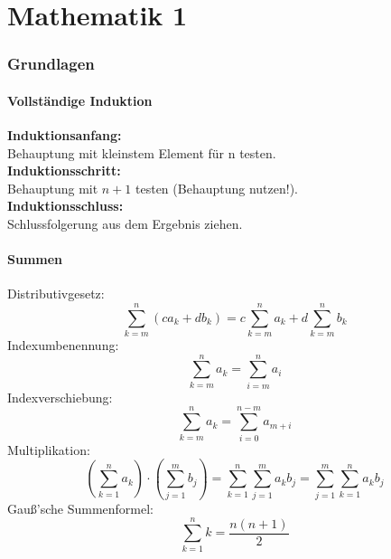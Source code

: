 \documentclass[a4paper,twocolumn,10pt]{article}
\begin{document}
\tableofcontents
\newpage

\part{Mathematik 1}

\section{Grundlagen}

\subsection{Vollständige Induktion}
\textbf{Induktionsanfang:}\\
Behauptung mit kleinstem Element für n testen.\\
\textbf{Induktionsschritt:}\\
Behauptung mit $n+1$ testen (Behauptung nutzen!).\\
\textbf{Induktionsschluss:}\\
Schlussfolgerung aus dem Ergebnis ziehen.

\subsection{Summen}
Distributivgesetz:\\
\begin{equation*}
\sum\limits_{k=m}^{n}(ca_k+db_k)=c\sum\limits_{k=m}^{n}a_k+d\sum\limits_{k=m}^{n}b_k
\end{equation*}
Indexumbenennung:\\
\begin{equation*}
\sum\limits_{k=m}^{n}a_k=\sum\limits_{i=m}^{n}a_i
\end{equation*}
Indexverschiebung:\\
\begin{equation*}
\sum\limits_{k=m}^{n}a_k=\sum\limits_{i=0}^{n-m}a_{m+i}
\end{equation*}
Multiplikation:\\
\begin{equation*}
\left(\sum\limits_{k=1}^{n}a_k\right)\cdot \left(\sum\limits_{j=1}^{m}b_j\right)=\sum\limits_{k=1}^{n}\sum\limits_{j=1}^{m}a_kb_j=\sum\limits_{j=1}^{m}\sum\limits_{k=1}^{n}a_kb_j
\end{equation*}
Gauß'sche Summenformel:\\
\begin{equation*}
\sum\limits_{k=1}^{n}k=\frac{n(n+1)}{2}
\end{equation*}
\end{document}
